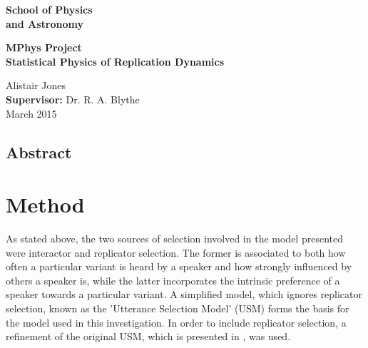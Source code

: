\documentclass[12pt]{article}
\begin{document}

\begin{minipage}[b]{110mm}
        {\Huge\bf School of Physics\\ and Astronomy
        \vspace*{17mm}}
\end{minipage}
\hfill
\begin{minipage}[t]{40mm}               
\end{minipage}

\vspace*{2cm}
\begin{center}
        \Large\bf \Large\bf MPhys Project\\
        \LARGE\bf Statistical Physics of Replication Dynamics
\end{center}
\vspace*{0.5cm}
\begin{center}
        Alistair Jones\\  
        {\bf Supervisor:} Dr. R. A. Blythe \\          
        March 2015     
\end{center}

\begin{center}
\subsection*{Abstract}
\end{center}

\newpage
\tableofcontents

\newpage
{}

\section{Method}
As stated above, the two sources of selection involved in the model presented were interactor and replicator selection. The former is associated to both how often a particular variant is heard by a speaker and how strongly influenced by others a speaker is, while the latter incorporates the intrinsic preference of a speaker towards a particular variant. A simplified model, which ignores replicator selection, known as the 'Utterance Selection Model' (USM) \cite{USM} forms the basis for the model used in this investigation. In order to include replicator selection, a refinement of the original USM, which is presented in \cite{refined}, was used. 
\end{document}

